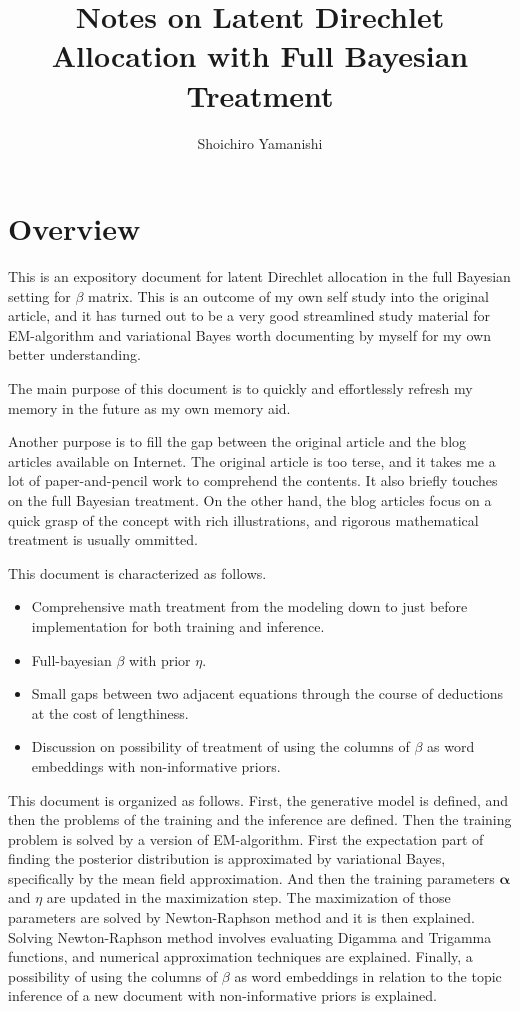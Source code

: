 \documentclass[a4]{article}
\title{ Notes on Latent Direchlet Allocation with Full Bayesian Treatment }
\author{Shoichiro Yamanishi}
\begin{document}
\maketitle



\section{Overview}
This is an expository document for latent Direchlet allocation in the full Bayesian setting
for $\beta$ matrix.
This is an outcome of my own self study into the original article, and it has turned out to be
a very good streamlined study material for EM-algorithm and variational Bayes worth documenting by myself for
my own better understanding.

The main purpose of this document is to quickly and effortlessly refresh my memory in the future
as my own memory aid.

Another purpose is to fill the gap between the original article\cite{NIPS2001_2070} and the blog articles
available on Internet. The original article is too terse, and it takes me a lot of paper-and-pencil work
to comprehend the contents.
It also briefly touches on the full Bayesian treatment. On the other hand, the blog
articles focus on a quick grasp of the concept with rich illustrations, and rigorous
mathematical treatment is usually ommitted.

This document is characterized as follows.
\begin{itemize}
\item Comprehensive math treatment from the modeling down to just before implementation for both training and inference.
\item Full-bayesian $\beta$ with prior $\eta$.
\item Small gaps between two adjacent equations through the course of deductions at the cost of lengthiness.
\item Discussion on possibility of treatment of using the columns of $\beta$ as word embeddings with non-informative priors.
\end{itemize}


This document is organized as follows. First, the generative model is defined,
and then the problems of the training and the inference are defined.
Then the training problem is solved by a version of EM-algorithm.
First the expectation part of finding the posterior distribution is approximated by
variational Bayes, specifically by the mean field approximation.
And then the training parameters $\bm{\alpha}$ and $\eta$ are updated in the maximization step.
The maximization of those parameters are solved by Newton-Raphson method and it is then explained.
Solving Newton-Raphson method involves evaluating Digamma and Trigamma functions, and 
numerical approximation techniques are explained.
Finally, a possibility of using the columns of $\beta$ as word embeddings in relation to 
the topic inference of a new document with non-informative priors is explained.
\end{document}
